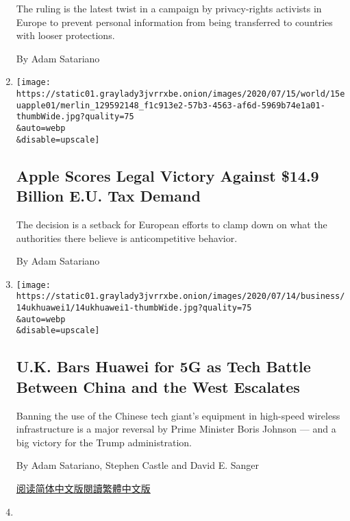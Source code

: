 \begin{enumerate}
  The ruling is the latest twist in a campaign by privacy-rights
  activists in Europe to prevent personal information from being
  transferred to countries with looser protections.

  By Adam Satariano
\item
  \href{/2020/07/15/business/apple-eu-ireland-tax.html}{}

  \texttt{[image: https://static01.graylady3jvrrxbe.onion/images/2020/07/15/world/15euapple01/merlin\_129592148\_f1c913e2-57b3-4563-af6d-5969b74e1a01-thumbWide.jpg?quality=75\\\&auto=webp\\\&disable=upscale]}

  \hypertarget{apple-scores-legal-victory-against-149-billion-eu-tax-demand}{%
  \subsection{Apple Scores Legal Victory Against \$14.9 Billion E.U. Tax
  Demand}\label{apple-scores-legal-victory-against-149-billion-eu-tax-demand}}

  The decision is a setback for European efforts to clamp down on what
  the authorities there believe is anticompetitive behavior.

  By Adam Satariano
\item
  \href{/2020/07/14/business/huawei-uk-5g.html}{}

  \texttt{[image: https://static01.graylady3jvrrxbe.onion/images/2020/07/14/business/14ukhuawei1/14ukhuawei1-thumbWide.jpg?quality=75\\\&auto=webp\\\&disable=upscale]}

  \hypertarget{uk-bars-huawei-for-5g-as-tech-battle-between-china-and-the-west-escalates}{%
  \subsection{U.K. Bars Huawei for 5G as Tech Battle Between China and
  the West
  Escalates}\label{uk-bars-huawei-for-5g-as-tech-battle-between-china-and-the-west-escalates}}

  Banning the use of the Chinese tech giant's equipment in high-speed
  wireless infrastructure is a major reversal by Prime Minister Boris
  Johnson --- and a big victory for the Trump administration.

  By Adam Satariano, Stephen Castle and David E. Sanger

  \href{https://cn.nytimes3xbfgragh.onion/business/20200715/huawei-uk-5g/}{阅读简体中文版}\href{https://cn.nytimes3xbfgragh.onion/business/20200715/huawei-uk-5g/zh-hant/}{閱讀繁體中文版}
\item
  \href{/2020/07/06/world/europe/brixton-london-eviction-grocer-nour.html}{}


\end{enumerate}
